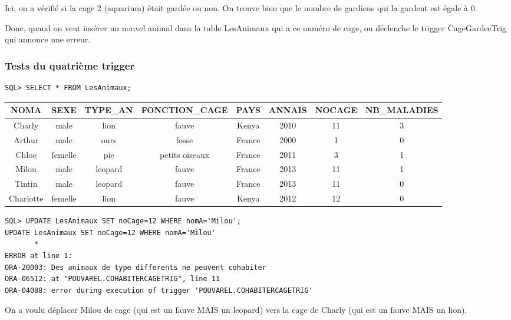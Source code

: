 \documentclass{article}
\begin{document}
Ici, on a vérifié si la cage 2 (aquarium) était gardée ou non. On trouve bien que le nombre de gardiens qui la gardent est égale à 0.

Donc, quand on veut insérer un nouvel animal dans la table LesAnimaux qui a ce numéro de cage, on déclenche le trigger CageGardeeTrig qui annonce une erreur.\\

\subsubsection*{Tests du quatrième trigger}
\begin{lstlisting}
SQL> SELECT * FROM LesAnimaux;
\end{lstlisting}
\begin{tabular}{|cccccccc|}
NOMA & SEXE & TYPE\_AN & FONCTION\_CAGE  & PAYS & ANNAIS & NOCAGE & NB\_MALADIES \\
\hline
Charly       &  male         &  lion         &  fauve       &   Kenya     &     2010         &  11         &    3             \\ 
Arthur        & male        &   ours          & fosse         & France      &   2000  &         1         &     0              \\
Chloe         & femelle  &      pie          &  petits oiseaux & France       &  2011     &      3        &      1             \\ 
Milou         & male    &       leopard     &   fauve       &   France      &   2013    &       11       &      1              \\
Tintin        & male  &         leopard   &     fauve    &      France      &   2013      &     11       &      0              \\
Charlotte    &  femelle     &   lion   &        fauve       &   Kenya      &    2012       &    12  &           0 \\
\end{tabular}

\begin{lstlisting}
SQL> UPDATE LesAnimaux SET noCage=12 WHERE nomA='Milou';
UPDATE LesAnimaux SET noCage=12 WHERE nomA='Milou'
       *
ERROR at line 1:
ORA-20003: Des animaux de type differents ne peuvent cohabiter
ORA-06512: at "POUVAREL.COHABITERCAGETRIG", line 11
ORA-04088: error during execution of trigger 'POUVAREL.COHABITERCAGETRIG'
\end{lstlisting}

On a voulu déplacer Milou de cage (qui est un fauve MAIS un leopard) vers la cage de Charly (qui est un fauve MAIS un lion). 
\end{document}
